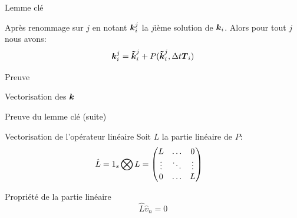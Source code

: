 \begin{frame}{Lemme clé}
\begin{lemma}
 Après renommage sur $j$ en notant ${\boldsymbol {k}}_{i}^{j}$ la $j$ième solution de ${\boldsymbol {k}}_{i}$.
Alors pour tout $j$ nous avons:
\begin{equation*}
  {\boldsymbol {k}}_{i}^{j}={\boldsymbol {\tilde{k}}}_{i}^{j}+P({\boldsymbol {\tilde{k}}}_{i}^{j},\Delta t {\boldsymbol {T}}_{i})
\end{equation*}
\end{lemma}
\begin{block}{Preuve}
\end{block}

\begin{block}{Vectorisation des ${\boldsymbol {k}}$}
 \end{block}

\end{frame}

\begin{frame}[<+->]{Preuve du lemme clé (suite)}
 \begin{block}{Vectorisation de l'opérateur linéaire}
 Soit $L$ la partie linéaire de $P$:
\begin{align*}
\hat{L}&=1_{s}\bigotimes L=\begin{pmatrix}L	&\ldots	&0\\
			\vdots &\ddots 	&\vdots\\
			0	&\ldots	&L\\
	\end{pmatrix}
\end{align*}
\end{block}
\begin{block}{Propriété de la partie linéaire}
\begin{equation*}
\hat{L}\hat{v}_{n}=0
\end{equation*}
 \end{block}

\end{frame}


